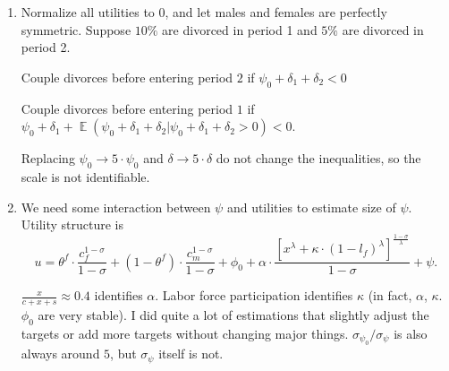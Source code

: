 \documentclass[12pt,letter]{article}
\DeclareMathOperator{\E}{\mathbb{E}}
\begin{document}
\begin{enumerate}
\item Normalize all utilities to $0$, and let males and females are perfectly symmetric. Suppose $10\%$ are divorced in period 1 and $5\%$ are divorced in period 2.

Couple divorces before entering period $2$ if $\psi_0 + \delta_1 + \delta_2 < 0$

Couple divorces before entering period $1$ if $\psi_0 + \delta_1 + \E(\psi_0 + \delta_1 + \delta_2 | \psi_0 + \delta_1 + \delta_2>0) < 0$.

Replacing $\psi_0 \to 5\cdot\psi_0$ and $\delta \to 5\cdot \delta$ do not change the inequalities, so the scale is not identifiable.

\item We need some interaction between $\psi$ and utilities to estimate size of $\psi$. Utility structure is
\[u = \theta^f\cdot \frac{c_f^{1-\sigma}}{1-\sigma} + (1-\theta^f)\cdot \frac{c_m^{1-\sigma}}{1-\sigma} + \phi_0 + \alpha \cdot \frac{\left[ x^\lambda + \kappa\cdot(1-l_f)^{\lambda}\right]^{\frac{1-\sigma}{\lambda}}}{1-\sigma} + \psi.\]

$\frac{x}{c+x + s} \approx 0.4$ identifies $\alpha$. Labor force participation identifies $\kappa$ (in fact, $\alpha$, $\kappa$. $\phi_0$ are very stable). I did quite a lot of estimations that slightly adjust the targets or add more targets without changing major things. $\sigma_{\psi_0} / \sigma_\psi$ is also always around $5$, but $\sigma_\psi$ itself is not.
\end{enumerate}

\newpage
\end{document}
